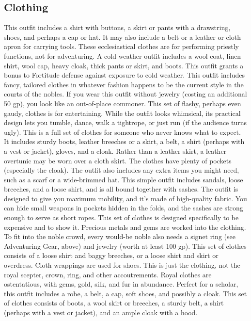     \subsection{Clothing}
         This outfit includes a shirt with buttons, a skirt or pants with a drawstring, shoes, and perhaps a cap or hat. It may also include a belt or a leather or cloth apron for carrying tools.
         These ecclesiastical clothes are for performing priestly functions, not for adventuring.
         A cold weather outfit includes a wool coat, linen shirt, wool cap, heavy cloak, thick pants or skirt, and
        boots. This outfit grants a  bonus to Fortitude defense against exposure to cold weather.
         This outfit includes fancy, tailored clothes in whatever fashion happens to be the current style in the courts of the nobles. If you wear this outfit without jewelry (costing an additional 50 gp), you look like an out-of-place commoner.
         This set of flashy, perhaps even gaudy, clothes is for entertaining. While the outfit looks whimsical, its practical design lets you tumble, dance, walk a tightrope, or just run (if the audience turns ugly).
         This is a full set of clothes for someone who never knows what to expect. It includes sturdy boots, leather breeches or a skirt, a belt, a shirt (perhaps with a vest or jacket), gloves, and a cloak. Rather than a leather skirt, a leather overtunic may be worn over a cloth skirt. The clothes have plenty of pockets (especially the cloak). The outfit also includes any extra items you might need, such as a scarf or a wide-brimmed hat.
         This simple outfit includes sandals, loose breeches, and a loose shirt, and is all bound together with sashes. The outfit is designed to give you maximum mobility, and it's made of high-quality fabric. You can hide small weapons in pockets hidden in the folds, and the sashes are strong enough to serve as short ropes.
         This set of clothes is designed specifically to be expensive and to show it. Precious metals and gems are worked into the clothing. To fit into the noble crowd, every would-be noble also needs a signet ring (see Adventuring Gear, above) and jewelry (worth at least 100 gp).
         This set of clothes consists of a loose shirt and baggy breeches, or a loose shirt and skirt or overdress. Cloth wrappings are used for shoes.
         This is just the clothing, not the royal scepter, crown, ring, and other accoutrements. Royal clothes are ostentatious, with gems, gold, silk, and fur in abundance.
         Perfect for a scholar, this outfit includes a robe, a belt, a cap, soft shoes, and possibly a cloak.
         This set of clothes consists of boots, a wool skirt or breeches, a sturdy belt, a shirt (perhaps with a vest or jacket), and an ample cloak with a hood.

